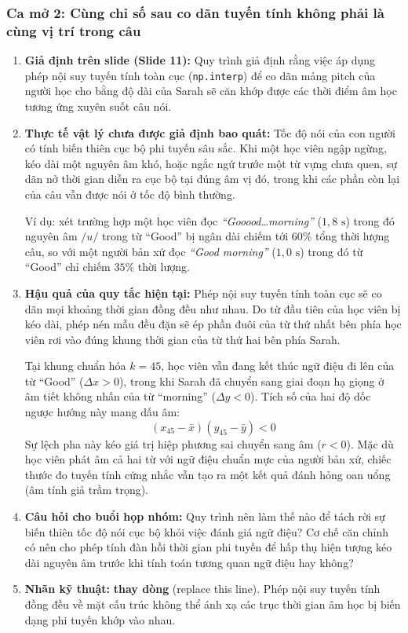 \documentclass[11pt,a4paper]{article}
\begin{document}
\subsubsection*{Ca mở 2: Cùng chỉ số sau co dãn tuyến tính không phải là cùng vị trí trong câu}

\begin{enumerate}
    \item \textbf{Giả định trên slide (Slide 11):} Quy trình giả định rằng việc áp dụng phép nội suy tuyến tính toàn cục (\texttt{np.interp}) để co dãn mảng pitch của người học cho bằng độ dài của Sarah sẽ căn khớp được các thời điểm âm học tương ứng xuyên suốt câu nói.
    \item \textbf{Thực tế vật lý chưa được giả định bao quát:} Tốc độ nói của con người có tính biến thiên cục bộ phi tuyến sâu sắc. Khi một học viên ngập ngừng, kéo dài một nguyên âm khó, hoặc ngắc ngứ trước một từ vựng chưa quen, sự dãn nở thời gian diễn ra cục bộ tại đúng âm vị đó, trong khi các phần còn lại của câu vẫn được nói ở tốc độ bình thường.

    Ví dụ: xét trường hợp một học viên đọc \textit{``Gooood\dots morning''} ($1{,}8\text{ s}$) trong đó nguyên âm $/u/$ trong từ ``Good'' bị ngân dài chiếm tới $60\%$ tổng thời lượng câu, so với một người bản xứ đọc \textit{``Good morning''} ($1{,}0\text{ s}$) trong đó từ ``Good'' chỉ chiếm $35\%$ thời lượng.
    \item \textbf{Hậu quả của quy tắc hiện tại:} Phép nội suy tuyến tính toàn cục sẽ co dãn mọi khoảng thời gian đồng đều như nhau. Do từ đầu tiên của học viên bị kéo dài, phép nén mẫu đều đặn sẽ ép phần đuôi của từ thứ nhất bên phía học viên rơi vào đúng khung thời gian của từ thứ hai bên phía Sarah.

    Tại khung chuẩn hóa $k = 45$, học viên vẫn đang kết thúc ngữ điệu đi lên của từ ``Good'' ($\Delta x > 0$), trong khi Sarah đã chuyển sang giai đoạn hạ giọng ở âm tiết không nhấn của từ ``morning'' ($\Delta y < 0$). Tích số của hai độ dốc ngược hướng này mang dấu âm:
    \begin{equation}
    (x_{45} - \bar{x})(y_{45} - \bar{y}) < 0
    \end{equation}
    Sự lệch pha này kéo giá trị hiệp phương sai chuyển sang âm ($r < 0$). Mặc dù học viên phát âm cả hai từ với ngữ điệu chuẩn mực của người bản xứ, chiếc thước đo tuyến tính cứng nhắc vẫn tạo ra một kết quả đánh hỏng oan uổng (âm tính giả trầm trọng).
    \item \textbf{Câu hỏi cho buổi họp nhóm:} Quy trình nên làm thế nào để tách rời sự biến thiên tốc độ nói cục bộ khỏi việc đánh giá ngữ điệu? Cơ chế căn chỉnh có nên cho phép tính đàn hồi thời gian phi tuyến để hấp thụ hiện tượng kéo dài nguyên âm trước khi tính toán tương quan ngữ điệu hay không?
    \item \textbf{Nhãn kỹ thuật:} \textbf{thay dòng} (replace this line). Phép nội suy tuyến tính đồng đều về mặt cấu trúc không thể ánh xạ các trục thời gian âm học bị biến dạng phi tuyến khớp vào nhau.
\end{enumerate}
\end{document}
